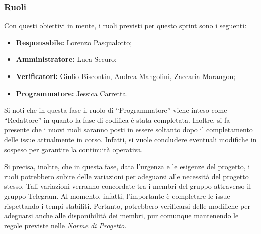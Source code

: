 \subsubsection{Ruoli}
Con questi obiettivi in mente, i ruoli previsti per questo sprint sono i seguenti:
\begin{itemize}
    \item \textbf{Responsabile:} Lorenzo Pasqualotto;
    \item \textbf{Amministratore:} Luca Securo;
    \item \textbf{Verificatori:} Giulio Biscontin, Andrea Mangolini, Zaccaria Marangon;
    \item \textbf{Programmatore:} Jessica Carretta.
\end{itemize}
Si noti che in questa fase il ruolo di ``Programmatore'' viene inteso come ``Redattore'' in quanto la fase di codifica è stata completata. Inoltre, si fa presente che i nuovi ruoli saranno posti in essere soltanto dopo il completamento delle issue attualmente in corso. Infatti, si vuole concludere eventuali modifiche in sospeso per garantire la continuità operativa.

\bigskip
\noindent Si precisa, inoltre, che in questa fase, data l'urgenza e le esigenze del progetto, i ruoli potrebbero subire delle variazioni per adeguarsi alle necessità del progetto stesso. Tali variazioni verranno concordate tra i membri del gruppo attraverso il gruppo Telegram. Al momento, infatti, l'importante è completare le issue rispettando i tempi stabiliti. Pertanto, potrebbero verificarsi delle modifiche per adeguarsi anche alle disponibilità dei membri, pur comunque mantenendo le regole previste nelle \textit{Norme di Progetto.}